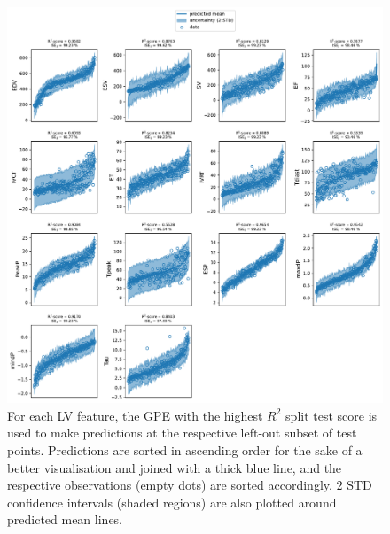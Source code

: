 \begin{figure}[ht!]
    \myfloatalign
    \includegraphics[width=\textwidth]{figures/chapter07/bgpes_vs_bsplit_16p.pdf}
    \caption{For each LV feature, the GPE with the highest $R^2$ split test score is used to make predictions at the respective left-out subset of test points. Predictions are sorted in ascending order for the sake of a better visualisation and joined with a thick blue line, and the respective observations (empty dots) are sorted accordingly. $2$ STD confidence intervals (shaded regions) are also plotted around predicted mean lines.}
    \label{fig:bgpevsbsplitfinal}
\end{figure}

